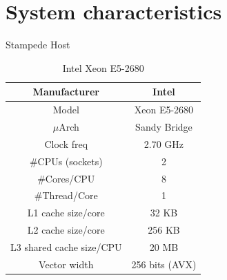 \documentclass{beamer}
\begin{document}

\section{System characteristics}

\begin{frame}{Stampede Host}
\begin{table}[H]
\centering
\footnotesize
\begin{tabular}{| c | c |}\hline
Manufacturer & Intel\\ \hline
Model & Xeon E5-2680\\ \hline
$\mu$Arch & Sandy Bridge\\ \hline
Clock freq & 2.70 GHz\\ \hline
\#CPUs (sockets) & 2 \\ \hline
\#Cores/CPU & 8\\ \hline
\#Thread/Core & 1\\ \hline
L1 cache size/core & 32 KB\\ \hline
L2 cache size/core & 256 KB\\ \hline
L3 shared cache size/CPU & 20 MB\\ \hline
Vector width & 256 bits (AVX)\\ \hline
\end{tabular}
\caption{Intel Xeon E5-2680}
\end{table}
\end{frame}

\end{document}
